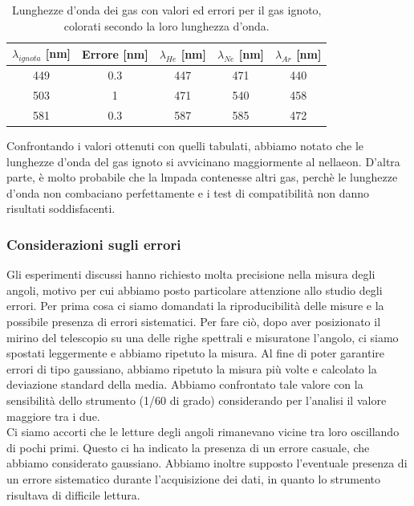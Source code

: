 \documentclass[letterpaper,12pt]{article}
\begin{document}
\begin{table}[h!]
    \centering
    \begin{tabular}{|c|c|c|c|c|}
    \hline
    \textbf{$\lambda_{ignota}$} [nm] & \textbf{Errore} [nm] & \textbf{$\lambda_{He}$} [nm] & \textbf{$\lambda_{Ne}$} [nm] & \textbf{$\lambda_{Ar}$} [nm]\\
    \hline
    \cellcolor{wavelength_449} 449 & \cellcolor{wavelength_nan}0.3 & \cellcolor{wavelength_447} 447 & \cellcolor{wavelength_471} 471 & \cellcolor{wavelength_440} 440 \\
    \hline
    \cellcolor{wavelength_503} 503 & \cellcolor{wavelength_nan}1 & \cellcolor{wavelength_471} 471 & \cellcolor{wavelength_540} 540 & \cellcolor{wavelength_458} 458 \\
    \hline
    \cellcolor{wavelength_581} 581 & \cellcolor{wavelength_nan}0.3 & \cellcolor{wavelength_587} 587 & \cellcolor{wavelength_585} 585 & \cellcolor{wavelength_472} 472 \\
    \hline
    \end{tabular}
    \caption{Lunghezze d'onda dei gas con valori ed errori per il gas ignoto, colorati secondo la loro lunghezza d'onda.}
    \label{tab:reticolo_ignoto}
\end{table}

Confrontando i valori ottenuti con quelli tabulati, abbiamo notato che le lunghezze d'onda del gas ignoto si avvicinano
maggiormente al nellaeon. D'altra parte, è molto probabile che la lmpada contenesse altri gas, perchè le lunghezze d'onda
non combaciano perfettamente e i test di compatibilità non danno risultati soddisfacenti. \\


\subsubsection{Considerazioni sugli errori}
Gli esperimenti discussi hanno richiesto molta precisione nella misura degli angoli, motivo per cui abbiamo posto particolare
attenzione allo studio degli errori. Per prima cosa ci siamo domandati la riproducibilità delle misure e la possibile presenza di errori sistematici.
Per fare ciò, dopo aver posizionato il mirino del telescopio su una delle righe spettrali e misuratone l'angolo, ci siamo spostati
leggermente e abbiamo ripetuto la misura. Al fine di poter garantire errori di tipo gaussiano, abbiamo ripetuto la misura
più volte e calcolato la deviazione standard della media. Abbiamo confrontato tale valore con la sensibilità dello strumento (1/60 di grado)
considerando per l'analisi il valore maggiore tra i due. \\
Ci siamo accorti che le letture degli angoli rimanevano vicine tra loro oscillando di pochi primi. Questo ci ha indicato
la presenza di un errore casuale, che abbiamo considerato gaussiano. Abbiamo inoltre supposto l'eventuale presenza di un errore
sistematico durante l'acquisizione dei dati, in quanto lo strumento risultava di difficile lettura. \\ 
\end{document}
